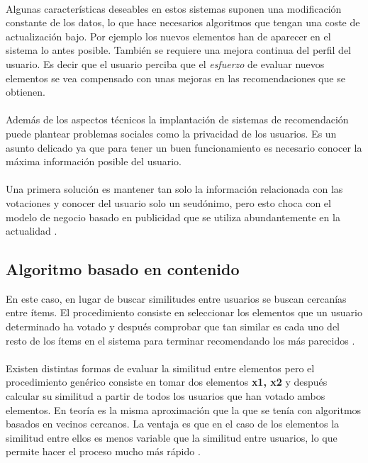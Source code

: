 \documentclass[12pt,letterpaper,oneside] {memoir}
\begin{document}
\paragraph{}
Algunas características deseables en estos sistemas suponen una modificación constante de los datos, lo que hace necesarios algoritmos que tengan una coste de actualización bajo.
Por ejemplo los nuevos elementos han de aparecer en el sistema lo antes posible. También se requiere una mejora continua del perfil del usuario. Es decir que el usuario perciba que el \textit{esfuerzo} de evaluar nuevos elementos se vea compensado con unas mejoras en las recomendaciones que se obtienen. 
\paragraph{}
Además de los aspectos técnicos la implantación de sistemas de recomendación puede plantear problemas sociales como la privacidad de los usuarios. Es un asunto delicado ya que para tener un buen funcionamiento es necesario conocer la máxima información posible del usuario.
\paragraph{}
Una primera solución es mantener tan solo la información relacionada con las votaciones y conocer del usuario solo un seudónimo, pero esto choca con el modelo de negocio basado en publicidad que se utiliza abundantemente en la actualidad \citep{GalanNieto1994}.

\subsection{Algoritmo basado en contenido}

En este caso, en lugar de buscar similitudes entre usuarios se buscan cercanías entre ítems. El procedimiento consiste en seleccionar los elementos  que un usuario determinado ha votado y después comprobar que tan similar es cada uno  del resto de los ítems en el sistema para terminar recomendando los más parecidos \citep{Ramezani0000}. 
\paragraph{}
Existen distintas formas de evaluar la similitud entre elementos pero el procedimiento genérico consiste en tomar dos elementos \textbf{x1, x2} y después calcular su similitud a partir de todos los usuarios que han votado ambos elementos. En teoría es la misma aproximación que la que se tenía con algoritmos basados en vecinos cercanos. La ventaja es que en el caso de los elementos la similitud entre ellos es menos variable que la similitud entre usuarios, lo que permite hacer el proceso mucho más rápido \citep{Sarwar2001, Deshpande2004}.
\end{document}
